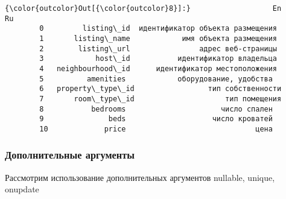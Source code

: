 \documentclass[11pt]{article}
\begin{document}
\begin{Verbatim}[commandchars=\\\{\}]
{\color{outcolor}Out[{\color{outcolor}8}]:}                   En                                Ru
        0         listing\_id  идентификатор объекта размещения
        1       listing\_name            имя объекта размещения
        2        listing\_url                адрес веб-страницы
        3            host\_id           идентификатор владельца
        4   neighbourhood\_id      идентификатор местоположения
        5          amenities            оборудование, удобства
        6   property\_type\_id                 тип собственности
        7       room\_type\_id                     тип помещения
        8           bedrooms                      число спален
        9               beds                    число кроватей
        10             price                              цена
\end{Verbatim}
            
    \subsubsection{Дополнительные
аргументы}\label{ux434ux43eux43fux43eux43bux43dux438ux442ux435ux43bux44cux43dux44bux435-ux430ux440ux433ux443ux43cux435ux43dux442ux44b}

Рассмотрим использование дополнительных аргументов nullable, unique,
onupdate
\end{document}
